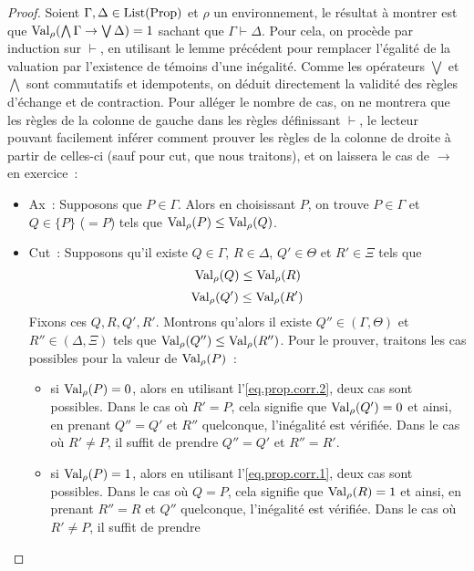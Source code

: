 \begin{proof}
  Soient $\Gamma,\Delta\in\operatorname{List}(\operatorname{Prop})$ et $\rho$ un environnement, le résultat
  à montrer est que $\operatorname{Val}_\rho(\bigwedge\Gamma\to\bigvee\Delta) = 1$ sachant que
  $\Gamma\vdash \Delta$. Pour cela, on procède par induction sur $\vdash$,
  en utilisant le lemme précédent pour remplacer l'égalité de la valuation par
  l'existence de témoins d'une inégalité. Comme les opérateurs $\bigvee$ et
  $\bigwedge$ sont commutatifs et idempotents, on déduit directement la validité
  des règles d'échange et de contraction. Pour alléger le nombre de cas, on ne
  montrera que les règles de la colonne de gauche dans les règles définissant
  $\vdash$, le lecteur pouvant facilement inférer comment prouver les règles
  de la colonne de droite à partir de celles-ci (sauf pour cut, que nous
  traitons), et on laissera le cas de $\to$ en exercice~:
  \begin{itemize}
  \item Ax~: Supposons que $P\in\Gamma$. Alors en choisissant $P$, on trouve
    $P\in\Gamma$ et $Q\in\{P\}$ ($=P$) tels que $\operatorname{Val}_\rho(P) \leq\operatorname{Val}_\rho(Q)$.
  \item Cut~: Supposons qu'il existe $Q\in\Gamma$, $R\in\Delta$, $Q'\in\Theta$
    et $R'\in\Xi$ tels que
    \begin{equation}\label{eq.prop.corr.1}
      \operatorname{Val}_\rho(Q)\leq\operatorname{Val}_\rho(R)
    \end{equation}
    \begin{equation}\label{eq.prop.corr.2}
      \operatorname{Val}_\rho(Q')\leq\operatorname{Val}_\rho(R')
    \end{equation}
    Fixons ces $Q,R,Q',R'$. Montrons qu'alors il existe $Q''\in(\Gamma,\Theta)$
    et $R''\in(\Delta,\Xi)$ tels que $\operatorname{Val}_\rho(Q'')\leq\operatorname{Val}_\rho(R'')$. Pour le
    prouver, traitons les cas possibles pour la valeur de $\operatorname{Val}_\rho(P)$~:
    \begin{itemize}
    \item si $\operatorname{Val}_\rho(P) = 0$, alors en utilisant l'\cref{eq.prop.corr.2},
      deux cas sont possibles. Dans le cas où $R' = P$, cela signifie que
      $\operatorname{Val}_\rho(Q') = 0$ et ainsi, en prenant $Q'' = Q'$ et $R''$ quelconque,
      l'inégalité est vérifiée. Dans le cas où $R' \neq P$, il suffit de prendre
      $Q'' = Q'$ et $R'' = R'$.
    \item si $\operatorname{Val}_\rho(P) = 1$, alors en utilisant l'\cref{eq.prop.corr.1},
      deux cas sont possibles. Dans le cas où $Q = P$, cela signifie que
      $\operatorname{Val}_\rho(R) = 1$ et ainsi, en prenant $R'' = R$ et $Q''$ quelconque,
      l'inégalité est vérifiée. Dans le cas où $R'\neq P$, il suffit de prendre

\end{itemize}
\end{itemize}
\end{proof}
